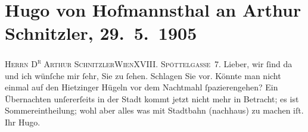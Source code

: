 

         
         \renewcommand{\erwaehntePersonen}{Personen: Hugo von Hofmannsthal}
         \renewcommand{\erwaehnteOrte}{Orte: Edmund-Weiß-Gasse 7, Rodaun, Wien, XIII., Hietzing, XVIII., Währing}
         \renewcommand{\erwaehnteWerke}{}
               \section[Hugo von Hofmannsthal an Arthur Schnitzler, 29. 5. 1905]{ Hugo von Hofmannsthal an Arthur Schnitzler, 29. 5. 1905}\nopagebreak{}\rehead{ }\begin{ledgroupsized}[t]{13cm}\normalsize\beginnumbering \toendnotes[C]{\smallbreak\pagebreak[2]} 
\pstart{}{\pb}\textsc{Herrn D\textsuperscript{r} Arthur Schnitzler}\pend{}\pstart{}\textsc{Wien}\pend{}\pstart{}\textsc{XVIII. Spöttelgasse 7}.\pend{}{\bigskip}\pstart
           \noindent{}{\pb}Lieber, wir ſind da und ich wünſche mir ſehr, Sie zu ſehen. Schlagen
               Sie vor. Könnte man nicht einmal auf den Hietzinger Hügeln vor dem Nachtmahl ſpazierengehen? Ein Übernachten
               unſererſeits in der Stadt kommt jetzt nicht mehr in Betracht; es ist
               Sommereintheilung; wohl aber alles was mit Stadtbahn (nachhaus) zu machen iſt.\pend
           \pstart Ihr \spacefill\mbox{Hugo.}\pend{}
         
         \endnumbering{}\end{ledgroupsized}  \newcommand{\dateiname}{L01521}\newcommand{\titel}{Hugo von Hofmannsthal an Arthur Schnitzler, 29. 5. 1905}\newcommand{\editorInnen}{Martin Anton Müller und Gerd-Hermann Susen}
      